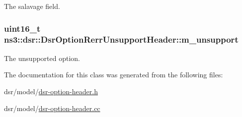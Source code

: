 The salavage field. 

\subsubsection[{\texorpdfstring{m\+\_\+unsupport}{m_unsupport}}]{\setlength{\rightskip}{0pt plus 5cm}uint16\+\_\+t ns3\+::dsr\+::\+Dsr\+Option\+Rerr\+Unsupport\+Header\+::m\+\_\+unsupport\hspace{0.3cm}{\ttfamily [private]}}\hypertarget{classns3_1_1dsr_1_1DsrOptionRerrUnsupportHeader_a5e4a3590ca429b9adff9b93607e90d2e}{}\label{classns3_1_1dsr_1_1DsrOptionRerrUnsupportHeader_a5e4a3590ca429b9adff9b93607e90d2e}


The unsupported option. 



The documentation for this class was generated from the following files\+:\begin{DoxyCompactItemize}
\item 
dsr/model/\hyperlink{dsr-option-header_8h}{dsr-\/option-\/header.\+h}\item 
dsr/model/\hyperlink{dsr-option-header_8cc}{dsr-\/option-\/header.\+cc}\end{DoxyCompactItemize}
